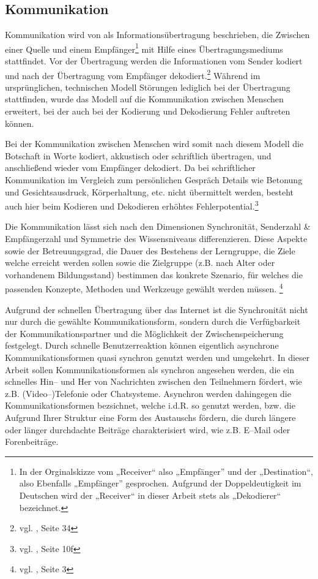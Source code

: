 \subsection{Kommunikation} %
\label{sub:kommunikation}
Kommunikation wird von \cite{shannonweaver} als Informationsübertragung beschrieben, die Zwischen einer Quelle  und einem Empfänger\footnote{In der Orginalskizze vom „Receiver“ also „Empfänger” und der „Destination“, also Ebenfalls „Empfänger” gesprochen. Aufgrund der Doppeldeutigkeit im Deutschen wird der „Receiver“ in dieser Arbeit stets als „Dekodierer“ bezeichnet.} mit Hilfe eines Übertragungsmediums stattfindet. Vor der Übertragung werden die Informationen vom Sender kodiert und nach der Übertragung vom Empfänger dekodiert.\footnote{vgl. \cite{shannonweaver}, Seite 34} Während im ursprünglichen, technischen Modell Störungen lediglich bei der Übertragung stattfinden, wurde das Modell auf die Kommunikation zwischen Menschen erweitert, bei der auch bei der Kodierung und Dekodierung Fehler auftreten können.

Bei der Kommunikation zwischen Menschen wird somit nach diesem Modell die Botschaft in Worte kodiert, akkustisch oder schriftlich übertragen, und anschließend wieder vom Empfänger dekodiert. Da bei schriftlicher Kommunikation im Vergleich zum persönlichen Gespräch Details wie Betonung und Gesichtsausdruck, Körperhaltung, etc. nicht übermittelt werden, besteht auch hier beim Kodieren und Dekodieren erhöhtes Fehlerpotential.\footnote{vgl. \cite{rothe}, Seite 10f}

Die Kommunikation lässt sich nach den Dimensionen Synchronität, Senderzahl \& Empfängerzahl und Symmetrie des Wissensniveaus differenzieren. Diese Aspekte sowie der Betreuungsgrad, die Dauer des Bestehens der Lerngruppe, die Ziele welche erreicht werden sollen sowie die Zielgruppe (z.B. nach Alter oder vorhandenem Bildungsstand) bestimmen das konkrete Szenario, für welches die passenden Konzepte, Methoden und Werkzeuge gewählt werden müssen. \footnote{vgl. \cite{csclcomp}, Seite 3}

Aufgrund der schnellen Übertragung über das Internet ist die Synchronität nicht nur durch die gewählte Kommunikationsform, sondern durch die Verfügbarkeit der Kommunikationspartner und die Möglichkeit der  Zwischenspeicherung festgelegt. Durch schnelle Benutzerreaktion können eigentlich asynchrone Kommunikationsformen quasi synchron genutzt werden und umgekehrt. In dieser Arbeit sollen Kommunikationsformen als synchron angesehen werden, die ein schnelles Hin-- und Her von Nachrichten zwischen den Teilnehmern fördert, wie z.B. (Video--)Telefonie oder Chatsysteme. Asynchron werden dahingegen die Kommunikationsformen bezsichnet, welche i.d.R. so genutzt werden, bzw. die Aufgrund Ihrer Struktur eine Form des Austauschs fördern, die durch längere oder länger durchdachte Beiträge charakterisiert wird, wie z.B. E--Mail oder Forenbeiträge.

